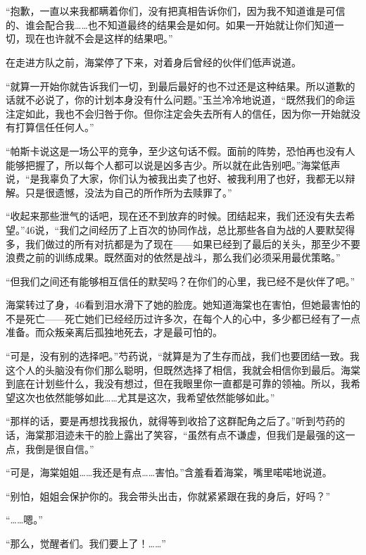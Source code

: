 \section*{}

“抱歉，一直以来我都瞒着你们，没有把真相告诉你们，因为我不知道谁是可信的、谁会配合我……也不知道最终的结果会是如何。如果一开始就让你们知道一切，现在也许就不会是这样的结果吧。”

在走进方队之前，海棠停了下来，对着身后曾经的伙伴们低声说道。

“就算一开始你就告诉我们一切，到最后最好的也不过还是这种结果。所以道歉的话就不必说了，你的计划本身没有什么问题。”玉兰冷冷地说道，“既然我们的命运注定如此，我也不会归咎于你。但你注定会失去所有人的信任，因为你一开始就没有打算信任任何人。”

“帕斯卡说这是一场公平的竞争，至少这句话不假。面前的阵势，恐怕再也没有人能够把握了，所以每个人都可以说是凶多吉少。所以就在此告别吧。”海棠低声说，“是我辜负了大家，你们认为被我出卖了也好、被我利用了也好，我都无以辩解。只是很遗憾，没法为自己的所作所为去赎罪了。”

“收起来那些泄气的话吧，现在还不到放弃的时候。团结起来，我们还没有失去希望。”46说，“我们之间经历了上百次的协同作战，总比那些各自为战的人要默契得多，我们做过的所有对抗都是为了现在——如果已经到了最后的关头，那至少不要浪费之前的训练成果。既然面对的依然是战斗，那么我们必须采用最优策略。”

“但我们之间还有能够相互信任的默契吗？在你们的心里，我已经不是伙伴了吧。”

海棠转过了身，46看到泪水滑下了她的脸庞。她知道海棠也在害怕，但她最害怕的不是死亡——死亡她们已经经历过许多次，在每个人的心中，多少都已经有了一点准备。而众叛亲离后孤独地死去，才是最可怕的。

“可是，没有别的选择吧。”芍药说，“就算是为了生存而战，我们也要团结一致。我这个人的头脑没有你们那么聪明，但既然选择了相信，我就会相信你到最后。海棠到底在计划些什么，我没有想过，但在我眼里你一直都是可靠的领袖。所以，我希望这次也依然能够如此……尤其是这次，我希望依然能够如此。”

“那样的话，要是再想找我报仇，就得等到收拾了这群配角之后了。”听到芍药的话，海棠那泪迹未干的脸上露出了笑容，“虽然有点不谦虚，但我们是最强的这一点，我倒是很自信。”

“可是，海棠姐姐……我还是有点……害怕。”含羞看着海棠，嘴里喏喏地说道。

“别怕，姐姐会保护你的。我会带头出击，你就紧紧跟在我的身后，好吗？”

“……嗯。”

“那么，觉醒者们。我们要上了！……”

